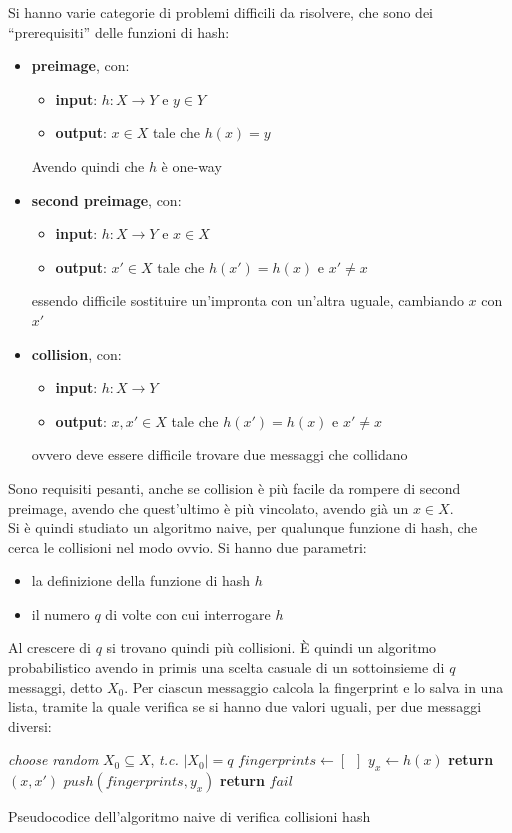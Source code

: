 \documentclass[a4paper,12pt, oneside]{book}
\begin{document}
Si hanno varie categorie di problemi difficili da risolvere, che sono dei
``prerequisiti'' delle funzioni di hash:
\begin{itemize}
  \item \textbf{preimage}, con:
  \begin{itemize}
    \item \textbf{input}: $h:X\to Y$ e $y\in Y$
    \item \textbf{output}: $x\in X$ tale che $h(x)=y$
  \end{itemize}
  Avendo quindi che $h$ è one-way
  \item \textbf{second preimage}, con:
  \begin{itemize}
    \item \textbf{input}: $h:X\to Y$ e $x\in X$
    \item \textbf{output}: $x'\in X$ tale che $h(x')=h(x)$ e $x'\neq x$
  \end{itemize}
  essendo difficile sostituire un'impronta con un'altra uguale, cambiando $x$
  con $x'$
  \item \textbf{collision}, con:
  \begin{itemize}
    \item \textbf{input}: $h:X\to Y$
    \item \textbf{output}: $x,x'\in X$ tale che $h(x')=h(x)$ e $x'\neq x$
  \end{itemize}
  ovvero deve essere difficile trovare due messaggi che collidano
\end{itemize}
Sono requisiti pesanti, anche se collision è più facile da rompere di second
preimage, avendo che quest'ultimo è più vincolato, avendo già un $x\in X$. \\
Si è quindi studiato un algoritmo naive, per qualunque funzione di hash, che
cerca le collisioni nel modo ovvio. Si hanno due parametri:
\begin{itemize}
  \item la definizione della funzione di hash $h$
  \item il numero $q$ di volte con cui interrogare $h$
\end{itemize}
Al crescere di $q$ si trovano quindi più collisioni. È quindi un algoritmo
probabilistico avendo in primis una scelta casuale di un sottoinsieme di $q$
messaggi, detto $X_0$. Per ciascun messaggio calcola la fingerprint e lo salva
in una lista, tramite la quale verifica se si hanno due valori uguali, per due
messaggi diversi:
\begin{algorithm}[H]
  \small
  \begin{algorithmic}
    \State \textit{choose random }$X_0\subseteq X$, \textit{t.c.} $|X_0|=q$
    \State $fingerprints\gets [\,\,\,]$
    \State $y_x\gets h(x)$
    \State \textbf{return} $(x,x')$
    \Else
    \State $push(fingerprints, y_x)$
    \EndIf
    \EndFor
    \State \textbf{return} $fail$
    \EndFunction
  \end{algorithmic}
  \label{algo:h1}
  \caption{Pseudocodice dell'algoritmo naive di verifica collisioni hash}
\end{algorithm}
\end{document}
